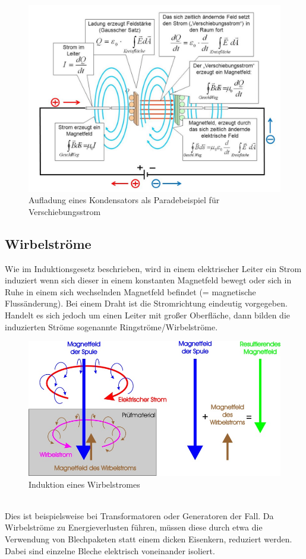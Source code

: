 			\begin{figure}[h]
				\centering
				\includegraphics[width=0.8\linewidth]{./pics/el/Iv}
				\caption{Aufladung eines Kondensators als Paradebeispiel für Verschiebungsstrom}
				\label{}
			\end{figure}	
		
		\subsection{Wirbelströme}
			Wie im Induktionsgesetz beschrieben, wird in einem elektrischer Leiter ein Strom induziert wenn sich dieser in einem konstanten Magnetfeld bewegt oder sich in Ruhe in einem sich wechselnden Magnetfeld befindet (= magnetische Flussänderung). Bei einem Draht ist die Stromrichtung eindeutig vorgegeben. Handelt es sich jedoch um einen Leiter mit großer Oberfläche, dann bilden die induzierten Ströme sogenannte Ringströme/Wirbelströme. 
			\begin{figure}[h]
				\centering
				\includegraphics[width=0.7\linewidth]{./pics/el/Wirbel2.jpg}
				\caption{Induktion eines Wirbelstromes}
			\end{figure}
			\leavevmode \\
			Dies ist beispielsweise bei Transformatoren oder Generatoren der Fall. Da Wirbelströme zu Energieverlusten führen, müssen diese durch etwa die Verwendung von Blechpaketen statt einem dicken Eisenkern, reduziert werden. Dabei sind einzelne Bleche elektrisch voneinander isoliert.
		
